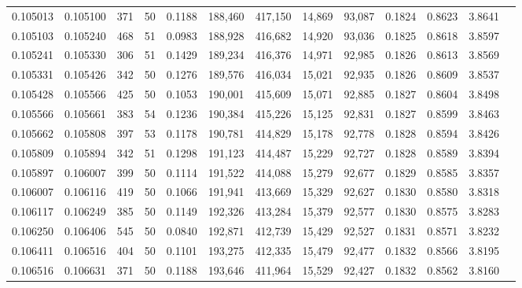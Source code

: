 \begin{tabular}{rrrrrrrrrrrrr}
0.105013 & 0.105100 &   371 &  50 &                                     0.1188 & 188,460 & 417,150 &  14,869 &  93,087 & 0.1824 & 0.8623 & 3.8641 \\
0.105103 & 0.105240 &   468 &  51 &                                     0.0983 & 188,928 & 416,682 &  14,920 &  93,036 & 0.1825 & 0.8618 & 3.8597 \\
0.105241 & 0.105330 &   306 &  51 &                                     0.1429 & 189,234 & 416,376 &  14,971 &  92,985 & 0.1826 & 0.8613 & 3.8569 \\
0.105331 & 0.105426 &   342 &  50 &                                     0.1276 & 189,576 & 416,034 &  15,021 &  92,935 & 0.1826 & 0.8609 & 3.8537 \\
0.105428 & 0.105566 &   425 &  50 &                                     0.1053 & 190,001 & 415,609 &  15,071 &  92,885 & 0.1827 & 0.8604 & 3.8498 \\
0.105566 & 0.105661 &   383 &  54 &                                     0.1236 & 190,384 & 415,226 &  15,125 &  92,831 & 0.1827 & 0.8599 & 3.8463 \\
0.105662 & 0.105808 &   397 &  53 &                                     0.1178 & 190,781 & 414,829 &  15,178 &  92,778 & 0.1828 & 0.8594 & 3.8426 \\
0.105809 & 0.105894 &   342 &  51 &                                     0.1298 & 191,123 & 414,487 &  15,229 &  92,727 & 0.1828 & 0.8589 & 3.8394 \\
0.105897 & 0.106007 &   399 &  50 &                                     0.1114 & 191,522 & 414,088 &  15,279 &  92,677 & 0.1829 & 0.8585 & 3.8357 \\
0.106007 & 0.106116 &   419 &  50 &                                     0.1066 & 191,941 & 413,669 &  15,329 &  92,627 & 0.1830 & 0.8580 & 3.8318 \\
0.106117 & 0.106249 &   385 &  50 &                                     0.1149 & 192,326 & 413,284 &  15,379 &  92,577 & 0.1830 & 0.8575 & 3.8283 \\
0.106250 & 0.106406 &   545 &  50 &                                     0.0840 & 192,871 & 412,739 &  15,429 &  92,527 & 0.1831 & 0.8571 & 3.8232 \\
0.106411 & 0.106516 &   404 &  50 &                                     0.1101 & 193,275 & 412,335 &  15,479 &  92,477 & 0.1832 & 0.8566 & 3.8195 \\
0.106516 & 0.106631 &   371 &  50 &                                     0.1188 & 193,646 & 411,964 &  15,529 &  92,427 & 0.1832 & 0.8562 & 3.8160 \\

\end{tabular}

